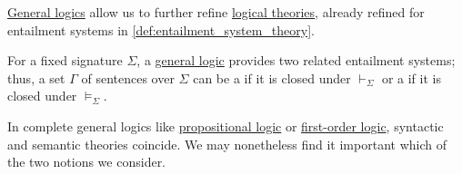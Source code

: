 \begin{definition}\label{def:general_logic_theory}\mimprovised
  \hyperref[def:general_logic]{General logics} allow us to further refine \hyperref[def:logical_theory]{logical theories}, already refined for entailment systems in \cref{def:entailment_system_theory}.

  For a fixed signature \( \Sigma \), a \hyperref[def:general_logic]{general logic} provides two related entailment systems; thus, a set \( \Gamma \) of sentences over \( \Sigma \) can be a  if it is closed under \( {\vdash_\Sigma} \) or a  if it is closed under \( {\vDash_\Sigma} \).
\end{definition}
\begin{comments}
  \item In complete general logics like \hyperref[def:propositional_logic]{propositional logic} or \hyperref[def:first_order_logic]{first-order logic}, syntactic and semantic theories coincide. We may nonetheless find it important which of the two notions we consider.
\end{comments}

